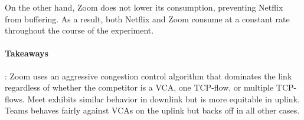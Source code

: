 On the other hand, Zoom does not lower its consumption, preventing Netflix from buffering. As a result, both Netflix and Zoom consume at a constant rate throughout the course of the experiment. 

\begin{mdframed}[roundcorner=5pt, backgroundcolor=black!10]
\paragraph{Takeaways}: Zoom uses an aggressive congestion control algorithm that dominates the link regardless of whether the competitor is a VCA, one TCP-flow, or multiple TCP-flows. Meet exhibits similar behavior in downlink but is more equitable in uplink. Teams behaves fairly against VCAs on the uplink but backs off in all other cases. 
\end{mdframed}

